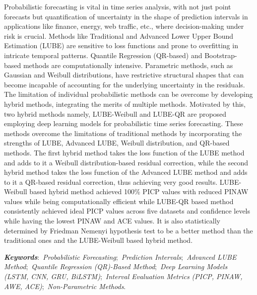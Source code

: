 \thispagestyle{empty} 
\noindent Probabilistic forecasting is vital in time series analysis, with not just point forecasts but quantification of uncertainty in the shape of prediction intervals in applications like finance, energy, web traffic, etc., where decision-making under risk is crucial. Methods like Traditional and Advanced Lower Upper Bound Estimation (LUBE) are sensitive to loss functions and prone to overfitting in intricate temporal patterns. Quantile Regression (QR-based) and Bootstrap-based methods are computationally intensive. Parametric methods, such as Gaussian and Weibull distributions, have restrictive structural shapes that can become incapable of accounting for the underlying uncertainty in the residuals. The limitation of individual probabilistic methods can be overcome by developing hybrid methods, integrating the merits of multiple methods. Motivated by this, two hybrid methods namely, LUBE-Weibull and LUBE-QR are proposed employing deep learning models for probabilistic time series forecasting. These methods overcome the limitations of traditional methods by incorporating the strengths of LUBE, Advanced LUBE, Weibull distribution, and QR-based methods. The first hybrid method takes the loss function of the LUBE method and adds to it a Weibull distribution-based residual correction, while the second hybrid method takes the loss function of the Advanced LUBE method and adds to it a QR-based residual correction, thus achieving very good results. LUBE-Weibull based hybrid method achieved 100\% PICP values with reduced PINAW values while being computationally efficient while LUBE-QR based method consistently achieved ideal PICP values across five datasets and confidence levels while having the lowest PINAW and ACE values. It is also statistically determined by Friedman Nemenyi hypothesis test to be a better method than the traditional ones and the LUBE-Weibull based hybrid method.

\vspace{5mm}
\noindent\textit\textbf{{Keywords}}:~\textit{Probabilistic Forecasting};~\textit{Prediction Intervals};~\textit{Advanced LUBE Method};~\textit{Quantile Regression (QR)-Based Method};~\textit{Deep Learning Models (LSTM, CNN, GRU, BiLSTM)};~\textit{Interval Evaluation Metrics (PICP, PINAW, AWE, ACE)};~\textit{Non-Parametric Methods}.